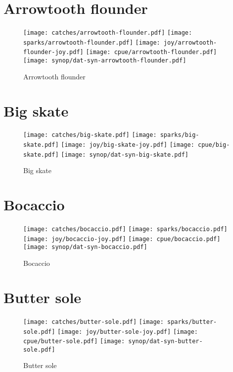 \section*{Arrowtooth flounder}

\begin{figure}[htbp]
\centering
\texttt{[image: catches/arrowtooth-flounder.pdf]}
\texttt{[image: sparks/arrowtooth-flounder.pdf]}
\texttt{[image: joy/arrowtooth-flounder-joy.pdf]}
\texttt{[image: cpue/arrowtooth-flounder.pdf]}
\texttt{[image: synop/dat-syn-arrowtooth-flounder.pdf]}
\caption{Arrowtooth flounder}
\end{figure}
\clearpage
\section*{Big skate}

\begin{figure}[htbp]
\centering
\texttt{[image: catches/big-skate.pdf]}
\texttt{[image: sparks/big-skate.pdf]}
\texttt{[image: joy/big-skate-joy.pdf]}
\texttt{[image: cpue/big-skate.pdf]}
\texttt{[image: synop/dat-syn-big-skate.pdf]}
\caption{Big skate}
\end{figure}
\clearpage
\section*{Bocaccio}

\begin{figure}[htbp]
\centering
\texttt{[image: catches/bocaccio.pdf]}
\texttt{[image: sparks/bocaccio.pdf]}
\texttt{[image: joy/bocaccio-joy.pdf]}
\texttt{[image: cpue/bocaccio.pdf]}
\texttt{[image: synop/dat-syn-bocaccio.pdf]}
\caption{Bocaccio}
\end{figure}
\clearpage
\section*{Butter sole}

\begin{figure}[htbp]
\centering
\texttt{[image: catches/butter-sole.pdf]}
\texttt{[image: sparks/butter-sole.pdf]}
\texttt{[image: joy/butter-sole-joy.pdf]}
\texttt{[image: cpue/butter-sole.pdf]}
\texttt{[image: synop/dat-syn-butter-sole.pdf]}
\caption{Butter sole}
\end{figure}
\clearpage
